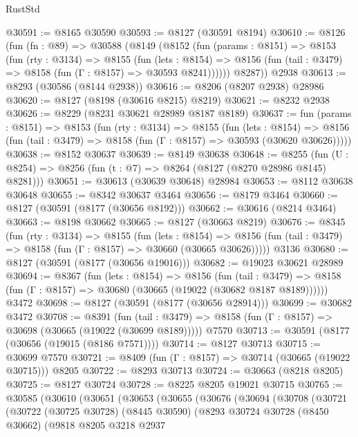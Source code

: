 \begin{lexlean}{RustStd}
\begin{coremodule}
@30591 := @8165 @30590
@30593 := @8127 (@30591 @8194)
@30610 := @8126
    (fun (fn : @89) =>
    @30588
      (@8149
        (@8152
          (fun (params : @8151) =>
          @8153
            (fun (rty : @3134) =>
            @8155
              (fun (lets : @8154) =>
              @8156 (fun (tail : @3479) => @8158 (fun (Γ : @8157) => @30593 @8241))))))
        @8287))
    @2938
@30613 := @8293 (@30586 (@8144 @2938))
@30616 := @8206 (@8207 @2938) @28986
@30620 := @8127 (@8198 (@30616 @8215) @8219)
@30621 := @8232 @2938
@30626 := @8229 (@8231 @30621 @28989 @8187 @8189)
@30637 := fun (params : @8151) =>
  @8153
    (fun (rty : @3134) =>
    @8155
      (fun (lets : @8154) =>
      @8156 (fun (tail : @3479) => @8158 (fun (Γ : @8157) => @30593 (@30620 @30626)))))
@30638 := @8152 @30637
@30639 := @8149 @30638
@30648 := @8255
    (fun (U : @8254) => @8256 (fun (t : @7) => @8264 (@8127 (@8270 @28986 @8145) @8281)))
@30651 := @30613 (@30639 @30648) @28984
@30653 := @8112 @30638 @30648
@30655 := @8342 @30637 @3464
@30656 := @8179 @3464
@30660 := @8127 (@30591 (@8177 (@30656 @8192)))
@30662 := @30616 (@8214 @3464)
@30663 := @8198 @30662
@30665 := @8127 (@30663 @8219)
@30676 := @8345
    (fun (rty : @3134) =>
    @8155
      (fun (lets : @8154) =>
      @8156 (fun (tail : @3479) => @8158 (fun (Γ : @8157) => @30660 (@30665 @30626)))))
    @3136
@30680 := @8127 (@30591 (@8177 (@30656 @19016)))
@30682 := @19023 @30621 @28989
@30694 := @8367
    (fun (lets : @8154) =>
    @8156
      (fun (tail : @3479) =>
      @8158 (fun (Γ : @8157) => @30680 (@30665 (@19022 (@30682 @8187 @8189))))))
    @3472
@30698 := @8127 (@30591 (@8177 (@30656 @28914)))
@30699 := @30682 @3472
@30708 := @8391
    (fun (tail : @3479) => @8158 (fun (Γ : @8157) => @30698 (@30665 (@19022 (@30699 @8189)))))
    @7570
@30713 := @30591 (@8177 (@30656 (@19015 (@8186 @7571))))
@30714 := @8127 @30713
@30715 := @30699 @7570
@30721 := @8409 (fun (Γ : @8157) => @30714 (@30665 (@19022 @30715))) @8205
@30722 := @8293 @30713
@30724 := @30663 (@8218 @8205)
@30725 := @8127 @30724
@30728 := @8225 @8205 @19021 @30715
@30765 := @30585
    (@30610
      (@30651
        (@30653
          (@30655
            (@30676
              (@30694
                (@30708
                  (@30721
                    (@30722
                      (@30725 @30728)
                      (@8445 @30590)
                      (@8293
                        @30724
                        @30728
                        (@8450 @30662)
                        (@9818
                          @8205
                          @3218
                          @2937

\end{coremodule}
\end{lexlean}

